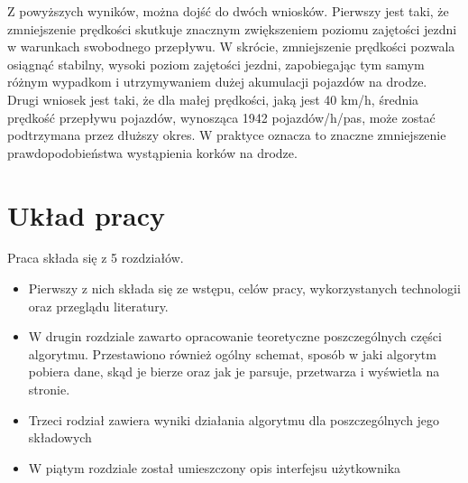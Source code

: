 Z powyższych wyników, można dojść do dwóch wniosków. Pierwszy jest taki, że zmniejszenie prędkości skutkuje znacznym zwiększeniem poziomu zajętości jezdni w warunkach swobodnego przepływu. W skrócie, zmniejszenie prędkości pozwala osiągnąć stabilny, wysoki poziom zajętości jezdni, zapobiegając tym samym różnym wypadkom i utrzymywaniem dużej akumulacji pojazdów na drodze. Drugi wniosek jest taki, że dla małej prędkości, jaką jest 40 km/h, średnia prędkość przepływu pojazdów, wynosząca 1942 pojazdów/h/pas, może zostać podtrzymana przez dłuższy okres. W praktyce oznacza to znaczne zmniejszenie prawdopodobieństwa wystąpienia korków na drodze.

\section{Układ pracy}
\label{sec:ukladPracy}

Praca składa się z 5 rozdziałów.

\begin{itemize}
\item Pierwszy z nich składa się ze wstępu, celów pracy, wykorzystanych technologii oraz przeglądu literatury.
\item W drugin rozdziale zawarto opracowanie teoretyczne poszczególnych części algorytmu. Przestawiono również ogólny schemat, sposób w jaki algorytm pobiera dane, skąd je bierze oraz jak je parsuje, przetwarza i wyświetla na stronie.
\item Trzeci rodział zawiera wyniki działania algorytmu dla poszczególnych jego składowych
\item W piątym rozdziale został umieszczony opis interfejsu użytkownika
\end{itemize}
